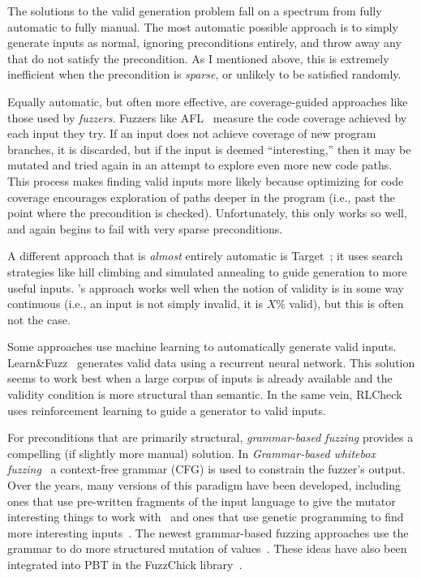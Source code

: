 The solutions to the valid generation problem fall on a spectrum from fully
automatic to fully manual. The most automatic possible approach is to simply
generate inputs as normal, ignoring preconditions entirely, and throw away any
that do not satisfy the precondition. As I mentioned above, this is extremely
inefficient when the precondition is {\em sparse}, or unlikely to be satisfied
randomly.

Equally automatic, but often more effective, are coverage-guided approaches like
those used by {\em fuzzers}. Fuzzers like AFL~\cite{afl-readme} measure the code
coverage achieved by each input they try. If an input does not achieve coverage
of new program branches, it is discarded, but if the input is deemed
``interesting,'' then it may be mutated and tried again in an attempt to explore
even more new code paths. This process makes finding valid inputs more likely
because optimizing for code coverage encourages exploration of paths deeper in
the program (i.e., past the point where the precondition is checked).
Unfortunately, this only works so well, and again begins to fail with very
sparse preconditions.

A different approach that is {\em almost} entirely automatic is {\sc
Target}~\cite{loscher2017targetedpbt}; it uses search strategies like hill
climbing and simulated annealing to guide generation to more useful inputs.
\citeauthor{loscher2017targetedpbt}'s approach works well when the notion of
validity is in some way continuous (i.e., an input is not simply invalid, it is
$X\%$ valid), but this is often not the case.

Some approaches use machine learning to automatically generate valid inputs.
{\sc Learn\&Fuzz}~\cite{godefroid2017learn} generates valid data using a
recurrent neural network.  This solution seems to work best when a large corpus
of inputs is already available and the validity condition is more structural
than semantic. In the same vein, {\sc RLCheck}~\cite{DBLP:conf/icse/ReddyLPS20}
uses reinforcement learning to guide a generator to valid inputs.

For preconditions that are primarily structural, {\em grammar-based fuzzing}
provides a compelling (if slightly more manual) solution. In {\em
Grammar-based whitebox fuzzing}~\cite{godefroid2008grammar} a context-free
grammar (CFG) is used to constrain the fuzzer's output. Over the years, many
versions of this paradigm have been developed, including ones that use
pre-written fragments of the input language to give the mutator interesting
things to work with~\cite{holler2012fuzzing} and ones that use genetic
programming to find more interesting inputs~\cite{veggalam2016ifuzzer}. The
newest grammar-based fuzzing approaches use the grammar to do more structured
mutation of values~\cite{wang2019superion,srivastava2021gramatron}. These ideas have also been integrated
into PBT in the FuzzChick library~\cite{DBLP:journals/pacmpl/Lampropoulos0P19}.

